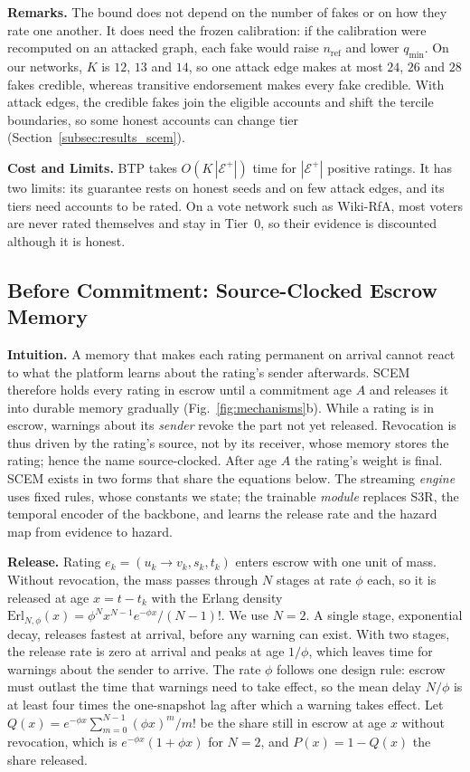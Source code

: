 \documentclass[lettersize,journal]{IEEEtran}
\begin{document}
\smallskip\noindent\textbf{Remarks.}
The bound does not depend on the number of fakes or on how they rate one another. It does need the frozen calibration: if the calibration were recomputed on an attacked graph, each fake would raise $n_{\mathrm{ref}}$ and lower $q_{\min}$.
On our networks, $K$ is $12$, $13$ and $14$, so one attack edge makes at most $24$, $26$ and $28$ fakes credible, whereas transitive endorsement makes every fake credible.
With attack edges, the credible fakes join the eligible accounts and shift the tercile boundaries, so some honest accounts can change tier (Section~\ref{subsec:results_scem}).

\smallskip\noindent\textbf{Cost and Limits.}
BTP takes $O(K\,|\mathcal{E}^+|)$ time for $|\mathcal{E}^+|$ positive ratings.
It has two limits: its guarantee rests on honest seeds and on few attack edges, and its tiers need accounts to be rated.
On a vote network such as Wiki-RfA, most voters are never rated themselves and stay in Tier~$0$, so their evidence is discounted although it is honest.

\subsection{Before Commitment: Source-Clocked Escrow Memory}
\label{sec:scem}

\noindent\textbf{Intuition.}
A memory that makes each rating permanent on arrival cannot react to what the platform learns about the rating's sender afterwards.
SCEM therefore holds every rating in escrow until a commitment age $A$ and releases it into durable memory gradually (Fig.~\ref{fig:mechanisms}b).
While a rating is in escrow, warnings about its \emph{sender} revoke the part not yet released.
Revocation is thus driven by the rating's source, not by its receiver, whose memory stores the rating; hence the name source-clocked.
After age $A$ the rating's weight is final.
SCEM exists in two forms that share the equations below. The streaming \emph{engine} uses fixed rules, whose constants we state; the trainable \emph{module} replaces S3R, the temporal encoder of the backbone, and learns the release rate and the hazard map from evidence to hazard.

\smallskip\noindent\textbf{Release.}
Rating $e_k = (u_k \to v_k, s_k, t_k)$ enters escrow with one unit of mass.
Without revocation, the mass passes through $N$ stages at rate $\phi$ each, so it is released at age $x = t - t_k$ with the Erlang density $\mathrm{Erl}_{N,\phi}(x) = \phi^N x^{N-1} e^{-\phi x}/(N-1)!$.
We use $N = 2$.
A single stage, exponential decay, releases fastest at arrival, before any warning can exist. With two stages, the release rate is zero at arrival and peaks at age $1/\phi$, which leaves time for warnings about the sender to arrive.
The rate $\phi$ follows one design rule: escrow must outlast the time that warnings need to take effect, so the mean delay $N/\phi$ is at least four times the one-snapshot lag after which a warning takes effect.
Let $Q(x) = e^{-\phi x}\sum_{m=0}^{N-1} (\phi x)^m/m!$ be the share still in escrow at age $x$ without revocation, which is $e^{-\phi x}(1 + \phi x)$ for $N = 2$, and $P(x) = 1 - Q(x)$ the share released.
\end{document}
